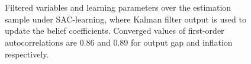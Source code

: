 \begin{figure}
    \centering

    \vspace{3 mm}
    \mbox{}\\
     \mbox{}\\
    
        \caption{Filtered variables and learning parameters over the estimation sample under SAC-learning, where Kalman filter output is used to update the belief coefficients. Converged values of first-order autocorrelations are $0.86$ and $0.89$ for output gap and inflation respectively.}
    \label{nkpc-sac-figure}
\end{figure}

